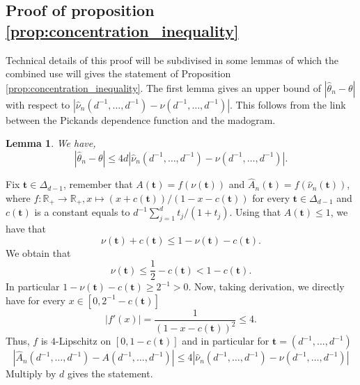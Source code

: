 \documentclass[11pt]{article}
\makeatletter
\newtheorem{lemma}{Lemma}
\renewenvironment{proof}[1][\proofname]{\par
\pushQED{\qed}%
\normalfont \topsep6\p@\@plus6\p@\relax
\trivlist
\item\relax
{\textbf{
#1\@addpunct{ }}}\hspace\labelsep\ignorespaces
}{%
\popQED\endtrivlist\@endpefalse
}
\makeatother
\begin{document}
	\subsection{Proof of proposition \ref{prop:concentration_inequality}}
	\label{subsec:proof_concent_ineq}
	Technical details of this proof will be subdivised in some lemmas of which the combined use will gives the statement of Proposition \ref{prop:concentration_inequality}. The first lemma gives an upper bound of $|\hat{\theta}_n - \theta|$ with respect to $|\hat{\nu}_n(d^{-1},\dots, d^{-1}) - \nu(d^{-1},\dots, d^{-1})|$. This follows from the link between the Pickands dependence function and the madogram.
	\begin{lemma}
		\label{lem:upper_bounds_ext_coeff}
		We have,
		\begin{equation*}
			|\hat{\theta}_n - \theta| \leq 4 d |\hat{\nu}_n(d^{-1},\dots,d^{-1}) - \nu(d^{-1},\dots,d^{-1}) |.
		\end{equation*}
	\end{lemma}
	\begin{proof}
		Fix $\textbf{t} \in \Delta_{d-1}$, remember that $A(\textbf{t}) = f(\nu(\textbf{t}))$ and $\hat{A}_n(\textbf{t}) = f(\hat{\nu}_n(\textbf{t}))$, where $f :\mathbb{R}_+ \rightarrow \mathbb{R}_+, x \mapsto (x + c(\textbf{t})) / (1 - x - c(\textbf{t}))$ for every $\textbf{t} \in \Delta_{d-1}$ and $c(\textbf{t})$ is a constant equals to $d^{-1} \sum_{j=1}^d t_j / (1+t_j)$. Using that $A(\textbf{t}) \leq 1$, we have that
		\begin{equation*}
			\nu(\textbf{t}) + c(\textbf{t}) \leq 1 - \nu(\textbf{t}) - c(\textbf{t}).
		\end{equation*}
		We obtain that
		\begin{equation*}
			\nu(\textbf{t}) \leq \frac{1}{2} - c(\textbf{t}) < 1 - c(\textbf{t}).
		\end{equation*}
		In particular $1 - \nu(\textbf{t}) - c(\textbf{t}) \geq 2^{-1} > 0$. Now, taking derivation, we directly have for every $x \in [0, 2^{-1}-c(\textbf{t})]$
		\begin{equation*}
			|f'(x)| = \frac{1}{(1-x - c(\textbf{t}))^2} \leq 4.
		\end{equation*}
		Thus, $f$ is $4$-Lipschitz on $[0, 1-c(\textbf{t})]$ and in particular for $\textbf{t} = (d^{-1}, \dots, d^{-1})$
		\begin{equation*}
			|\hat{A}_n(d^{-1},\dots,d^{-1}) - A(d^{-1}, \dots, d^{-1})| \leq 4 |\hat{\nu}_n(d^{-1},\dots, d^{-1}) - \nu(d^{-1},\dots, d^{-1})|
		\end{equation*}
		Multiply by $d$ gives the statement.
	\end{proof}
	
\end{document}
